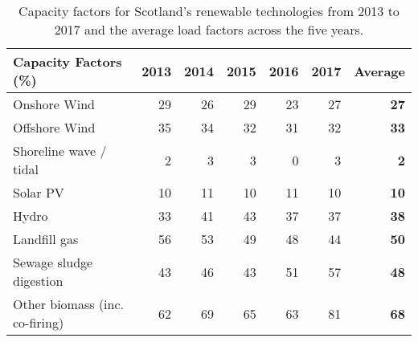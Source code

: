 \begin{table}[H]
	\caption{Capacity factors for Scotland's renewable technologies from 2013 to 2017 \citep{BEIS2018REs} and the average load factors across the five years.}
	\label{tbl:CFs}
	\centering
	\begin{tabular}{@{}lrrrrrr@{}}
		\toprule
		Capacity Factors (\%) & 2013 & 2014 & 2015 & 2016 & 2017 & \textbf{Average} \\ \midrule
		Onshore Wind & 29 & 26 & 29 & 23 & 27 & \textbf{27} \\
		Offshore Wind & 35 & 34 & 32 & 31 & 32 & \textbf{33} \\
		Shoreline wave / tidal & 2 & 3 & 3 & 0 & 3 & \textbf{2} \\
		Solar PV & 10 & 11 & 10 & 11 & 10 & \textbf{10} \\
		Hydro & 33 & 41 & 43 & 37 & 37 & \textbf{38} \\
		Landfill gas & 56 & 53 & 49 & 48 & 44 & \textbf{50} \\
		Sewage sludge digestion & 43 & 46 & 43 & 51 & 57 & \textbf{48} \\
		Other biomass (inc. co-firing) & 62 & 69 & 65 & 63 & 81 & \textbf{68} \\ \bottomrule
	\end{tabular}
\end{table}
